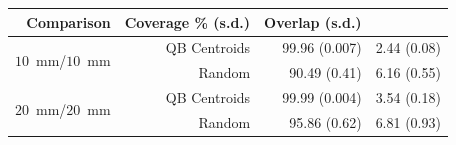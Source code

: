 \documentclass{bioinfo}
\begin{document}
\begin{table}[th]  {\begin{tabular}{rrrr} %
Comparison & Coverage \% (s.d.) & Overlap (s.d.) \\ \hline
\multirow{2}{*}{$10$~mm/$10$~mm} & QB Centroids & 99.96 (0.007) & 2.44
(0.08)\\ & Random & 90.49 (0.41) & 6.16 (0.55)\\ \hline
\multirow{2}{*}{$20$~mm/$20$~mm} & QB Centroids & 99.99 (0.004) & 3.54
(0.18)\\ & Random & 95.86 (0.62) & 6.81 (0.93)\\ \hline
\end{tabular}}{}
\end{table}



%
%
%
%

\end{document}
